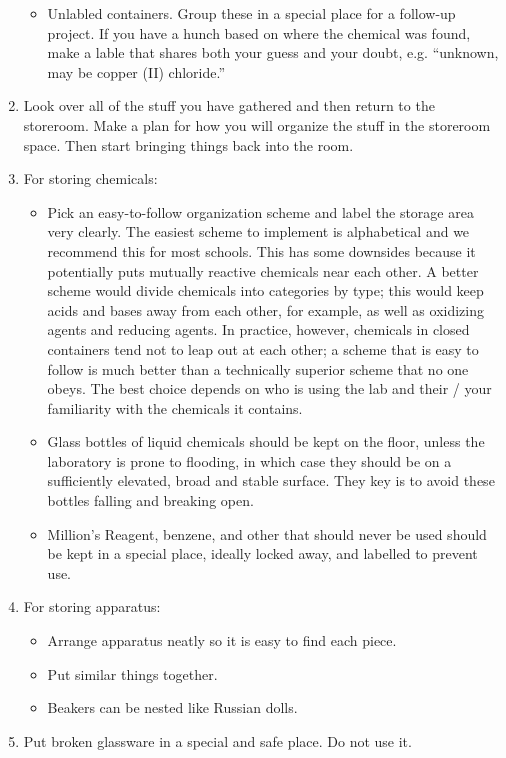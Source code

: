 \begin{enumerate}
{\begin{itemize}
\item{Unlabled containers. Group these in a special place for a follow-up project. If you have a hunch based on where the chemical was found, make a lable that shares both your guess and your doubt, e.g. ``unknown, may be copper (II) chloride.''}
\end{itemize}
}
\item{Look over all of the stuff you have gathered and then return to the storeroom. Make a plan for how you will organize the stuff in the storeroom space. Then start bringing things back into the room.}
\item{For storing chemicals:
\begin{itemize}
\item{Pick an easy-to-follow organization scheme and label the storage area very clearly. The easiest scheme to implement is alphabetical and we recommend this for most schools. This has some downsides because it potentially puts mutually reactive chemicals near each other. A better scheme would divide chemicals into categories by type; this would keep acids and bases away from each other, for example, as well as oxidizing agents and reducing agents. In practice, however, chemicals in closed containers tend not to leap out at each other; a scheme that is easy to follow is much better than a technically superior scheme that no one obeys. The best choice depends on who is using the lab and their / your familiarity with the chemicals it contains.}
\item{Glass bottles of liquid chemicals should be kept on the floor, unless the laboratory is prone to flooding, in which case they should be on a sufficiently elevated, broad and stable surface. They key is to avoid these bottles falling and breaking open.}
\item{Million's Reagent, benzene, and other  that should never be used should be kept in a special place, ideally locked away, and labelled to prevent use.}

\end{itemize}
}
\item{For storing apparatus: 
\begin{itemize}
\item{Arrange apparatus neatly so it is easy to find each piece.}
\item{Put similar things together.}
\item{Beakers can be nested like Russian dolls.}
\end{itemize}
}
\item{Put broken glassware in a special and safe place. Do not use it.}
\end{enumerate}

